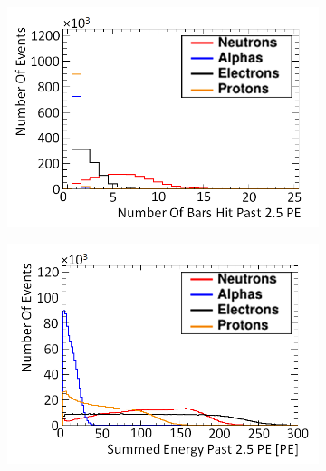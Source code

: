 \begin{figure}[!h]
\centering
\begin{subfigure}{.49\textwidth}
  \centering
  \includegraphics[width=\linewidth]{Chapter4.5/Figs/preTrigNba2.5.png}
  \captionsetup{width=.9\linewidth}
  \caption{}
  \label{subFig:preTrigNba2.5}
\end{subfigure}%
\begin{subfigure}{.49\textwidth}
  \centering
  \includegraphics[width=\linewidth]{Chapter4.5/Figs/preTrigSea2.5.png}
  \captionsetup{width=.9\linewidth}
  \caption{}
  \label{subFig:preTrigSea2.5}
\end{subfigure}
\begin{subfigure}{.49\textwidth}
  \centering

\end{subfigure}
\end{figure}
